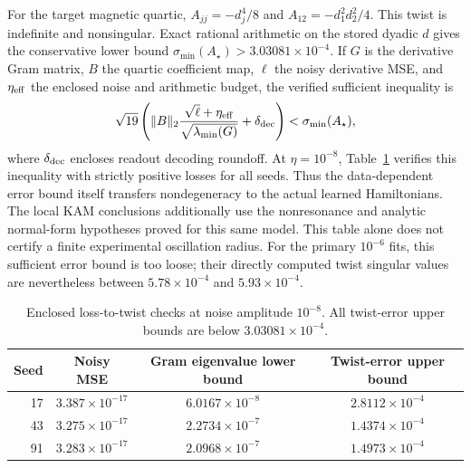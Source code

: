 For the target magnetic quartic,
$A_{jj}=-d_j^4/8$ and $A_{12}=-d_1^2d_2^2/4$.
This twist is indefinite and nonsingular. Exact rational arithmetic on the
stored dyadic $d$ gives the conservative lower bound
$\sigma_{\min}(A_\star)>3.03081\times10^{-4}$.
If $G$ is the derivative Gram matrix, $B$ the quartic coefficient map,
$\ell$ the noisy derivative MSE, and $\eta_{\rm eff}$ the enclosed noise
and arithmetic budget, the verified sufficient inequality is
\begin{equation}
 \sqrt{19}\left(
 \|B\|_2\frac{\sqrt{\ell}+\eta_{\rm eff}}
                  {\sqrt{\lambda_{\min}(G)}}+\delta_{\rm dec}
 \right)<\sigma_{\min}(A_\star),
 \label{eq:unified-verified-twist}
\end{equation}
where $\delta_{\rm dec}$ encloses readout decoding roundoff.
At $\eta=10^{-8}$, Table~\ref{tab:unified-gram} verifies this inequality
with strictly positive losses for all seeds. Thus the data-dependent
error bound itself transfers nondegeneracy to the actual learned
Hamiltonians. The local KAM conclusions additionally use the nonresonance
and analytic normal-form hypotheses proved for this same model.
This table alone does not certify a finite experimental oscillation radius.
For the primary $10^{-6}$ fits, this sufficient error bound is too loose;
their directly computed twist singular values are nevertheless between
$5.78\times10^{-4}$ and $5.93\times10^{-4}$.

\begin{table}[t]
\centering
\caption{Enclosed loss-to-twist checks at noise amplitude $10^{-8}$.
All twist-error upper bounds are below $3.03081\times10^{-4}$.}
\label{tab:unified-gram}
\small
\begin{tabular}{rccc}
\hline
Seed & Noisy MSE & Gram eigenvalue lower bound & Twist-error upper bound\\
\hline
17 & $3.387\times10^{-17}$ & $6.0167\times10^{-8}$ & $2.8112\times10^{-4}$\\
43 & $3.275\times10^{-17}$ & $2.2734\times10^{-7}$ & $1.4374\times10^{-4}$\\
91 & $3.283\times10^{-17}$ & $2.0968\times10^{-7}$ & $1.4973\times10^{-4}$\\
\hline
\end{tabular}
\end{table}

